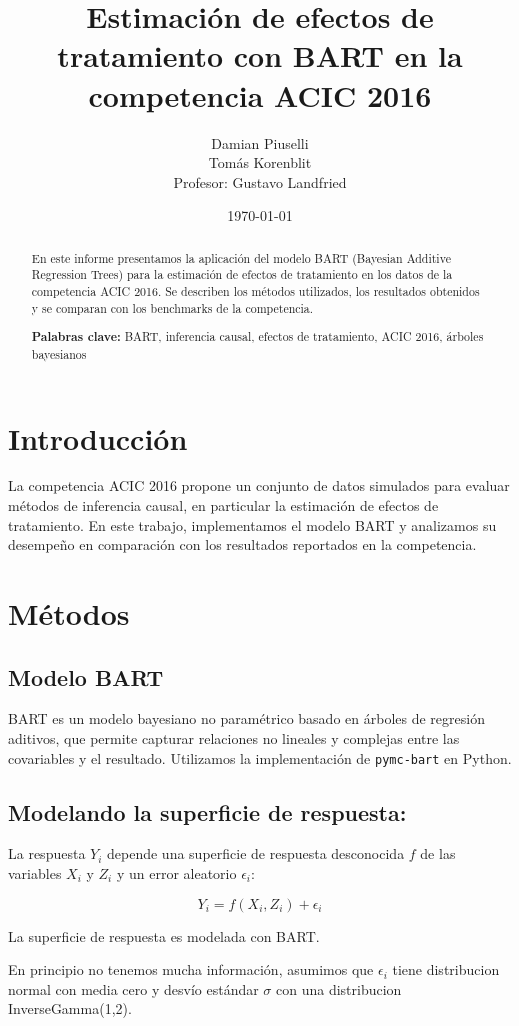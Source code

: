 \documentclass[a4paper,12pt]{article}
\title{Estimación de efectos de tratamiento con BART en la competencia ACIC 2016}
\author{Damian Piuselli \\ Tomás Korenblit \\ Profesor: Gustavo Landfried}
\date{\today}
\begin{document}
\maketitle

\begin{abstract}
En este informe presentamos la aplicación del modelo BART (Bayesian Additive Regression Trees) para la estimación de efectos de tratamiento en los datos de la competencia ACIC 2016. Se describen los métodos utilizados, los resultados obtenidos y se comparan con los benchmarks de la competencia.

\noindent\textbf{Palabras clave:} BART, inferencia causal, efectos de tratamiento, ACIC 2016, árboles bayesianos
\end{abstract}

\section{Introducción}
La competencia ACIC 2016 propone un conjunto de datos simulados para evaluar métodos de inferencia causal, en particular la estimación de efectos de tratamiento. En este trabajo, implementamos el modelo BART y analizamos su desempeño en comparación con los resultados reportados en la competencia.

\section{Métodos}
\subsection{Modelo BART}
BART es un modelo bayesiano no paramétrico basado en árboles de regresión aditivos, que permite capturar relaciones no lineales y complejas entre las covariables y el resultado. Utilizamos la implementación de \texttt{pymc-bart} en Python.

\subsection{Modelando la superficie de respuesta:}
La respuesta $Y_i$ depende una superficie de respuesta desconocida $f$ de las variables $X_i$ y $Z_i$ y un error aleatorio $\epsilon_i$:

\[ Y_i = f(X_i, Z_i) + \epsilon_i \]

La superficie de respuesta es modelada con BART.

En principio no tenemos mucha información, asumimos que $\epsilon_i$ tiene distribucion normal con media cero y desvío estándar $\sigma$ con una distribucion InverseGamma(1,2).
\end{document}
